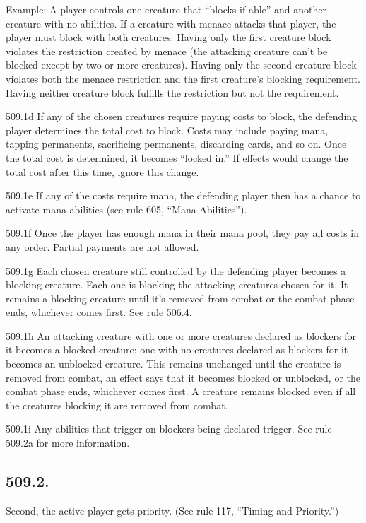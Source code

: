 Example: A player controls one creature that “blocks if able” and another creature with no abilities. If a creature with menace attacks that player, the player must block with both creatures. Having only the first creature block violates the restriction created by menace (the attacking creature can’t be blocked except by two or more creatures). Having only the second creature block violates both the menace restriction and the first creature’s blocking requirement. Having neither creature block fulfills the restriction but not the requirement.

509.1d If any of the chosen creatures require paying costs to block, the defending player determines the total cost to block. Costs may include paying mana, tapping permanents, sacrificing permanents, discarding cards, and so on. Once the total cost is determined, it becomes “locked in.” If effects would change the total cost after this time, ignore this change.

509.1e If any of the costs require mana, the defending player then has a chance to activate mana abilities (see rule 605, “Mana Abilities”).

509.1f Once the player has enough mana in their mana pool, they pay all costs in any order. Partial payments are not allowed.

509.1g Each chosen creature still controlled by the defending player becomes a blocking creature. Each one is blocking the attacking creatures chosen for it. It remains a blocking creature until it’s removed from combat or the combat phase ends, whichever comes first. See rule 506.4.

509.1h An attacking creature with one or more creatures declared as blockers for it becomes a blocked creature; one with no creatures declared as blockers for it becomes an unblocked creature. This remains unchanged until the creature is removed from combat, an effect says that it becomes blocked or unblocked, or the combat phase ends, whichever comes first. A creature remains blocked even if all the creatures blocking it are removed from combat.

509.1i Any abilities that trigger on blockers being declared trigger. See rule 509.2a for more information.

\subsection*{509.2.}
Second, the active player gets priority. (See rule 117, “Timing and Priority.”)

